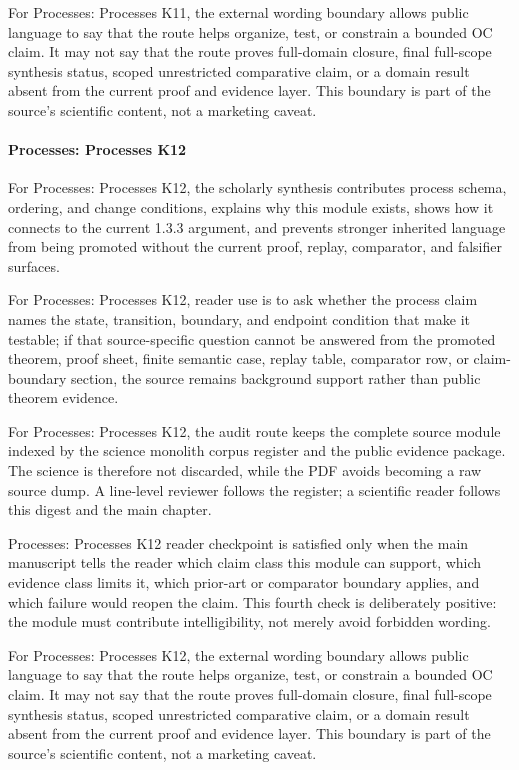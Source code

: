 For Processes: Processes K11, the external wording boundary allows public language to say that the route helps organize, test, or constrain a bounded OC claim. It may not say that the route proves full-domain closure, final full-scope synthesis status, scoped unrestricted comparative claim, or a domain result absent from the current proof and evidence layer. This boundary is part of the source's scientific content, not a marketing caveat.


\paragraph{Processes: Processes K12}

For Processes: Processes K12, the scholarly synthesis contributes process schema, ordering, and change conditions, explains why this module exists, shows how it connects to the current 1.3.3 argument, and prevents stronger inherited language from being promoted without the current proof, replay, comparator, and falsifier surfaces.


For Processes: Processes K12, reader use is to ask whether the process claim names the state, transition, boundary, and endpoint condition that make it testable; if that source-specific question cannot be answered from the promoted theorem, proof sheet, finite semantic case, replay table, comparator row, or claim-boundary section, the source remains background support rather than public theorem evidence.


For Processes: Processes K12, the audit route keeps the complete source module indexed by the science monolith corpus register and the public evidence package. The science is therefore not discarded, while the PDF avoids becoming a raw source dump. A line-level reviewer follows the register; a scientific reader follows this digest and the main chapter.


Processes: Processes K12 reader checkpoint is satisfied only when the main manuscript tells the reader which claim class this module can support, which evidence class limits it, which prior-art or comparator boundary applies, and which failure would reopen the claim. This fourth check is deliberately positive: the module must contribute intelligibility, not merely avoid forbidden wording.


For Processes: Processes K12, the external wording boundary allows public language to say that the route helps organize, test, or constrain a bounded OC claim. It may not say that the route proves full-domain closure, final full-scope synthesis status, scoped unrestricted comparative claim, or a domain result absent from the current proof and evidence layer. This boundary is part of the source's scientific content, not a marketing caveat.


